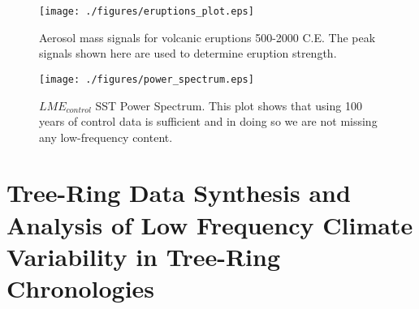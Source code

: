 \documentclass[phd,tocprelim]{cornell}
\begin{document}
\begin{figure}[!tbp]
\centering
\begin{minipage}[b]{0.45\textwidth}
\texttt{[image: ./figures/eruptions\_plot.eps]}
\caption{Aerosol mass signals for volcanic eruptions 500-2000 C.E. The peak signals shown here are used to determine eruption strength. }
\label{erups:plot}
\end{minipage}
\hfill
\begin{minipage}[b]{0.45\textwidth}
\texttt{[image: ./figures/power\_spectrum.eps]}
\caption{$LME_{control}$ SST Power Spectrum. This plot shows that using 100 years of control data is sufficient and in doing so we are not missing any low-frequency content.}
\label{spectrum}
\end{minipage}
\end{figure}

\clearpage
\newpage

\chapter{Tree-Ring Data Synthesis and Analysis of Low Frequency 
Climate Variability in Tree-Ring Chronologies} %
\end{document}
